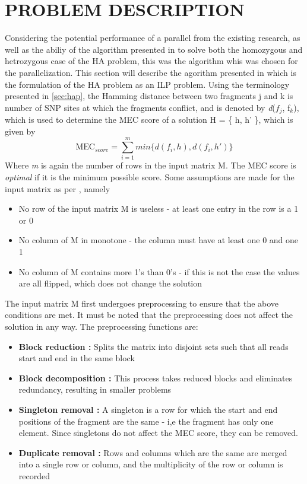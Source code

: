 \documentclass[10pt,twocolumn]{witseiepaper}
\newcommand{\M}{\textit{m }}
\newcommand{\D}{\textit{d}}
\begin{document}

\section{ PROBLEM DESCRIPTION } \label{sec:probdes}

Considering the potential performance of a parallel from the existing research, as well as the abiliy of the
algorithm presented in \cite{chen:2013} to solve both the homozygous and hetrozygous case of the HA problem,
this was the algorithm whis was chosen for the parallelization. This section will describe the agorithm
presented in \cite{chen:2013} which is the formulation of the HA problem as an ILP problem. Using the
terminology presented in \ref{sec:hap}, the Hamming distance between two fragments j and k is number of SNP 
sites at which the fragments conflict, and is denoted by \D($f_j$, f$_k$), which is used to determine the
MEC score of a solution H = \{ h, h' \}, which is given by
\begin{equation}
\textrm{MEC$_{score}$} = \sum_{i = 1}^{m}{ min\{ \D(f_i, h), \D(f_i, h') \} }
\end{equation}
Where \M is again the number of rows in the input matrix M. The MEC score is \textit{optimal} if it is the
minimum possible score. Some assumptions are made for the input matrix as per \cite{chen:2013}, namely
\begin{itemize}
\item{ No row of the input matrix M is useless - at least one entry in the row is a 1 or 0 
}
\item{ No column of M in monotone - the column must have at least one 0 and one 1
}
\item{ No column of M contains more 1's than 0's - if this is not the case the values are all flipped, which
    does not change the solution
}
\end{itemize}
The input matrix M first undergoes preprocessing to ensure that the above conditions are met. It must be noted
that the preprocessing does not affect the solution in any way. The preprocessing functions are:
\begin{itemize}
\item{ \textbf{Block reduction :} Splits the matrix into disjoint sets such that all reads start and end
        in the same block
}
\item{ \textbf{Block decomposition :} This process takes reduced blocks and eliminates redundancy, resulting
    in smaller problems 
}
\item{ \textbf{Singleton removal :} A singleton is a row for which the start and end positions of the fragment
    are the same - i,e the fragment has only one element. Since singletons do not affect the MEC score,
    they can be removed.
}
\item{ \textbf{Duplicate removal :} Rows and columns which are the same are merged into a single row or
        column, and the multiplicity of the row or column is recorded
}
\end{itemize}
\end{document}
